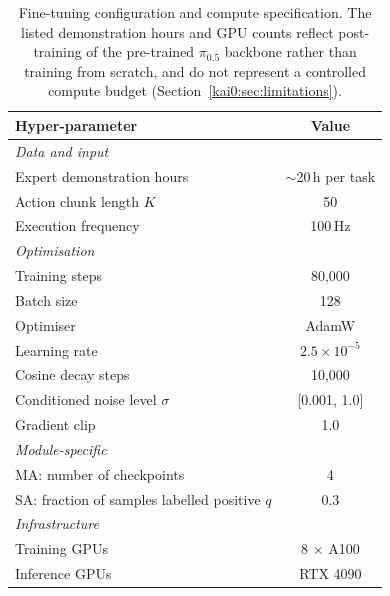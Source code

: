 \begin{table}[tb]
  \centering
  \caption[Hyper-parameters for fine-tuning]{Fine-tuning configuration and compute specification. The listed demonstration hours and GPU counts reflect post-training of the pre-trained $\pi_{0.5}$ backbone rather than training from scratch, and do not represent a controlled compute budget (Section~\ref{kai0:sec:limitations}).}
  \label{kai0:tab:hyperparams}
  \begin{tabular}{lc}
    \toprule
    \textbf{Hyper-parameter} & \textbf{Value} \\
    \midrule
    \multicolumn{2}{l}{\textit{Data and input}} \\
    Expert demonstration hours & $\sim$20\,h per task \\
    Action chunk length $K$ & 50 \\
    Execution frequency & 100\,Hz \\
    \midrule
    \multicolumn{2}{l}{\textit{Optimisation}} \\
    Training steps & 80{,}000 \\
    Batch size & 128 \\
    Optimiser & AdamW \\
    Learning rate & $2.5 \times 10^{-5}$ \\
    Cosine decay steps & 10{,}000 \\
    Conditioned noise level $\sigma$ & [0.001, 1.0] \\
    Gradient clip & 1.0 \\
    \midrule
    \multicolumn{2}{l}{\textit{Module-specific}} \\
    MA: number of checkpoints & 4 \\
    SA: fraction of samples labelled positive $q$ & 0.3 \\
    \midrule
    \multicolumn{2}{l}{\textit{Infrastructure}} \\
    Training GPUs & 8 $\times$ A100 \\
    Inference GPUs & RTX 4090 \\
    \bottomrule
  \end{tabular}
\end{table}


